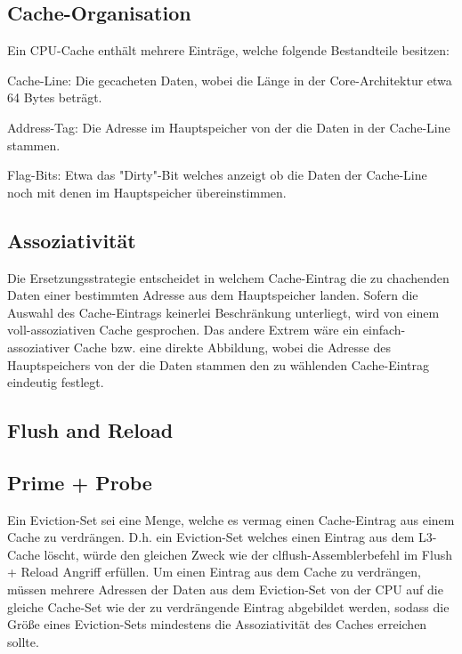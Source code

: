 \subsection{Cache-Organisation}

Ein CPU-Cache enthält mehrere Einträge, welche folgende Bestandteile besitzen:
\begin{enum}
\item Cache-Line: Die gecacheten Daten, wobei die Länge in der Core-Architektur etwa 64 Bytes beträgt.
\item Address-Tag: Die Adresse im Hauptspeicher von der die Daten in der Cache-Line stammen.
\item Flag-Bits: Etwa das "Dirty"-Bit welches anzeigt ob die Daten der Cache-Line noch mit denen im Hauptspeicher übereinstimmen.
\end{enum}


\subsection{Assoziativität}

Die Ersetzungsstrategie entscheidet in welchem Cache-Eintrag die zu chachenden Daten einer bestimmten Adresse aus dem Hauptspeicher landen. Sofern die Auswahl des Cache-Eintrags keinerlei Beschränkung unterliegt, wird von einem voll-assoziativen Cache gesprochen. Das andere Extrem wäre ein einfach-assoziativer Cache bzw. eine direkte Abbildung, wobei die Adresse des Hauptspeichers von der die Daten stammen den zu wählenden Cache-Eintrag eindeutig festlegt.

\subsection{Flush and Reload}

\subsection{Prime + Probe}

Ein Eviction-Set sei eine Menge, welche es vermag einen Cache-Eintrag aus einem Cache zu verdrängen. D.h. ein Eviction-Set welches einen Eintrag aus dem L3-Cache löscht, würde den gleichen Zweck wie der clflush-Assemblerbefehl im Flush + Reload Angriff erfüllen. Um einen Eintrag aus dem Cache zu verdrängen, müssen mehrere Adressen der Daten aus dem Eviction-Set von der CPU auf die gleiche Cache-Set wie der zu verdrängende Eintrag abgebildet werden, sodass die Größe eines Eviction-Sets mindestens die Assoziativität des Caches erreichen sollte.

